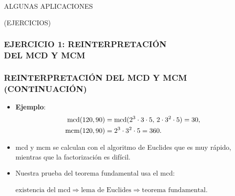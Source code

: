 \begin{frame}

  \vfill

  \begin{center}\huge\headingfont
    ALGUNAS APLICACIONES

    (EJERCICIOS)
  \end{center}

  \vfill
\end{frame}

\begin{frame}
  \frametitle{EJERCICIO 1: REINTERPRETACIÓN\\DEL MCD Y MCM}


\end{frame}

\begin{frame}
  \frametitle{REINTERPRETACIÓN DEL MCD Y MCM (CONTINUACIÓN)}

  \begin{itemize}
  \item<2-> \textbf{Ejemplo}:
    \begin{align*}
      \operatorname{mcd} (120, 90) & = \operatorname{mcd} (2^3\cdot 3\cdot 5, \, 2\cdot 3^2\cdot 5) = 30, \\
      \operatorname{mcm} (120, 90) & = 2^3\cdot 3^2\cdot 5 = 360.
    \end{align*}

  \item<3-> mcd y mcm se calculan con el algoritmo de Euclides que es muy
    rápido, mientras que la factorización es difícil.

  \item<4-> Nuestra prueba del teorema fundamental usa el mcd:

    $\text{existencia del mcd} \Longrightarrow
    \text{lema de Euclides} \Longrightarrow
    \text{teorema fundamental}$.
  \end{itemize}
\end{frame}

